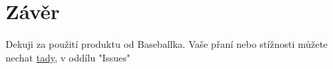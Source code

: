 \documentclass[12pt,a4paper]{article}
\begin{document}
	
	
	
	\newpage
	\section*{\LARGE Závěr}
	
	Dekuji za použití produktu od Baseballka. Vaše přaní nebo stížnosti můžete nechat \href{https://github.com/natal1H/IVS-Baseballka} {tady}, v oddílu "Issues"

	
\end{document}
